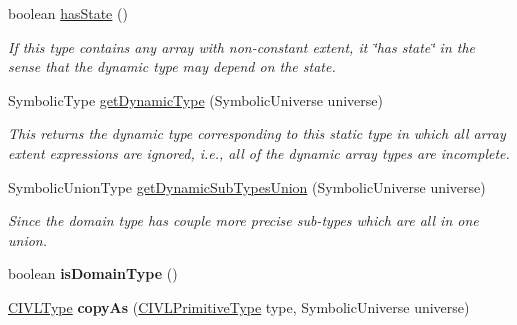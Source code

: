 \begin{DoxyCompactItemize}
\item 
boolean \hyperlink{classedu_1_1udel_1_1cis_1_1vsl_1_1civl_1_1model_1_1common_1_1type_1_1CommonDomainType_a37edd29ccbf71f790083056de05fa87e}{has\+State} ()
\begin{DoxyCompactList}\small\item\em If this type contains any array with non-\/constant extent, it \char`\"{}has state\char`\"{} in the sense that the dynamic type may depend on the state. \end{DoxyCompactList}\item 
Symbolic\+Type \hyperlink{classedu_1_1udel_1_1cis_1_1vsl_1_1civl_1_1model_1_1common_1_1type_1_1CommonDomainType_a387b8d5a128ebe65e5c4aff813c60cc9}{get\+Dynamic\+Type} (Symbolic\+Universe universe)
\begin{DoxyCompactList}\small\item\em This returns the dynamic type corresponding to this static type in which all array extent expressions are ignored, i.\+e., all of the dynamic array types are incomplete. \end{DoxyCompactList}\item 
Symbolic\+Union\+Type \hyperlink{classedu_1_1udel_1_1cis_1_1vsl_1_1civl_1_1model_1_1common_1_1type_1_1CommonDomainType_a566023f7060c57a8a9d6201e487ca848}{get\+Dynamic\+Sub\+Types\+Union} (Symbolic\+Universe universe)
\begin{DoxyCompactList}\small\item\em Since the domain type has couple more precise sub-\/types which are all in one union. \end{DoxyCompactList}\item 
\hypertarget{classedu_1_1udel_1_1cis_1_1vsl_1_1civl_1_1model_1_1common_1_1type_1_1CommonDomainType_a8d69783154f5631c0759448ab256664d}{}boolean {\bfseries is\+Domain\+Type} ()\label{classedu_1_1udel_1_1cis_1_1vsl_1_1civl_1_1model_1_1common_1_1type_1_1CommonDomainType_a8d69783154f5631c0759448ab256664d}

\item 
\hypertarget{classedu_1_1udel_1_1cis_1_1vsl_1_1civl_1_1model_1_1common_1_1type_1_1CommonDomainType_a7a0f283be5e81cb0c72e8db0d0c7abbe}{}\hyperlink{interfaceedu_1_1udel_1_1cis_1_1vsl_1_1civl_1_1model_1_1IF_1_1type_1_1CIVLType}{C\+I\+V\+L\+Type} {\bfseries copy\+As} (\hyperlink{interfaceedu_1_1udel_1_1cis_1_1vsl_1_1civl_1_1model_1_1IF_1_1type_1_1CIVLPrimitiveType}{C\+I\+V\+L\+Primitive\+Type} type, Symbolic\+Universe universe)\label{classedu_1_1udel_1_1cis_1_1vsl_1_1civl_1_1model_1_1common_1_1type_1_1CommonDomainType_a7a0f283be5e81cb0c72e8db0d0c7abbe}


\end{DoxyCompactItemize}
